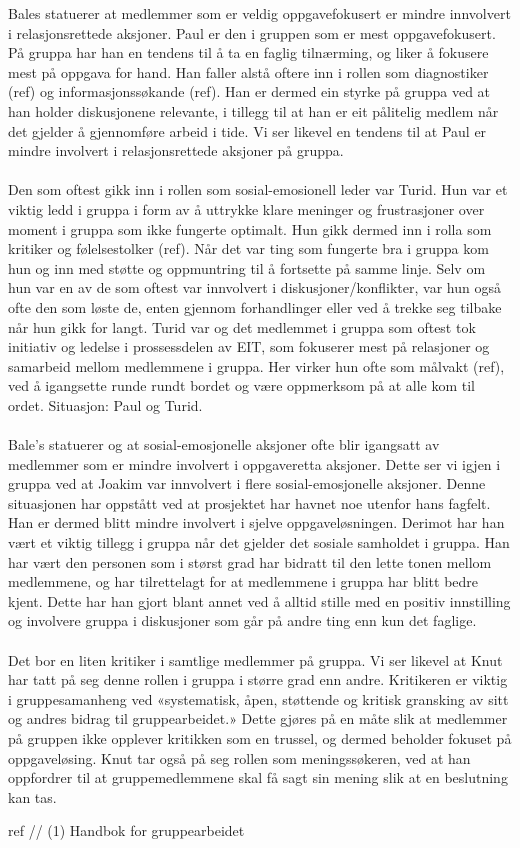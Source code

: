 Bales statuerer at medlemmer som er veldig oppgavefokusert er mindre innvolvert 
i relasjonsrettede aksjoner. Paul er den i gruppen som er mest oppgavefokusert. 
På gruppa har han en tendens til å ta en faglig tilnærming, og liker å fokusere 
mest på oppgava for hand. Han faller alstå oftere inn i rollen som diagnostiker 
(ref) og informasjonssøkande (ref). Han er dermed ein styrke på gruppa ved at han 
holder diskusjonene relevante, i tillegg til at han er eit pålitelig medlem når 
det gjelder å gjennomføre arbeid i tide. Vi ser likevel en tendens til at Paul 
er mindre involvert i relasjonsrettede aksjoner på gruppa.
\\
\\
Den som oftest gikk inn i rollen som sosial-emosionell leder var Turid. Hun var et 
viktig ledd i gruppa i form av å uttrykke klare meninger og frustrasjoner over 
moment i gruppa som ikke fungerte optimalt. Hun gikk dermed inn i rolla som kritiker 
og følelsestolker (ref). Når det var ting som fungerte bra i gruppa kom hun og inn 
med støtte og oppmuntring til å fortsette på samme linje. Selv om hun var en av de 
som oftest var innvolvert i diskusjoner/konflikter, var hun også ofte den som løste de, 
enten gjennom forhandlinger eller ved å trekke seg tilbake når hun gikk for langt. 
Turid var og det medlemmet i gruppa som oftest tok initiativ og ledelse i prossessdelen av EIT, 
som fokuserer mest på relasjoner og samarbeid mellom medlemmene i gruppa. Her virker hun 
ofte som målvakt (ref), ved å igangsette runde rundt bordet og være oppmerksom på at alle kom til ordet.
Situasjon: Paul og Turid.
\\
\\
Bale's statuerer og at sosial-emosjonelle aksjoner ofte blir igangsatt av medlemmer som er 
mindre involvert i oppgaveretta aksjoner. Dette ser vi igjen i gruppa ved at Joakim var 
innvolvert i flere sosial-emosjonelle aksjoner. Denne situasjonen har oppstått ved at 
prosjektet har havnet noe utenfor hans fagfelt. Han er dermed blitt mindre involvert i 
sjelve oppgaveløsningen. Derimot har han vært et viktig tillegg i gruppa når det gjelder 
det sosiale samholdet i gruppa. Han har vært den personen som i størst grad har bidratt 
til den lette tonen mellom medlemmene, og har tilrettelagt for at medlemmene i gruppa har 
blitt bedre kjent. Dette har han gjort blant annet ved å alltid stille med en positiv 
innstilling og involvere gruppa i diskusjoner som går på andre ting enn kun det faglige.
\\
\\
Det bor en liten kritiker i samtlige medlemmer på gruppa. Vi ser likevel at Knut har tatt 
på seg denne rollen i gruppa i større grad enn andre. Kritikeren er viktig i gruppesamanheng 
ved «systematisk, åpen, støttende og kritisk gransking av sitt og andres bidrag til gruppearbeidet.»
Dette gjøres på en måte slik at medlemmer på gruppen ikke opplever kritikken som en trussel, 
og dermed beholder fokuset på oppgaveløsing. Knut tar også på seg rollen som meningssøkeren, 
ved at han oppfordrer til at gruppemedlemmene skal få sagt sin mening slik at en beslutning
kan tas.

ref // (1) Handbok for gruppearbeidet
